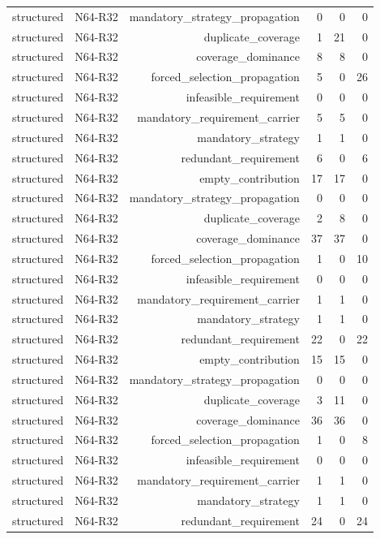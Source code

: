 {\begin{longtable}{lrrrrr}
structured & N64-R32 & mandatory\_strategy\_propagation & 0 & 0 & 0 \\
structured & N64-R32 & duplicate\_coverage & 1 & 21 & 0 \\
structured & N64-R32 & coverage\_dominance & 8 & 8 & 0 \\
structured & N64-R32 & forced\_selection\_propagation & 5 & 0 & 26 \\
structured & N64-R32 & infeasible\_requirement & 0 & 0 & 0 \\
structured & N64-R32 & mandatory\_requirement\_carrier & 5 & 5 & 0 \\
structured & N64-R32 & mandatory\_strategy & 1 & 1 & 0 \\
structured & N64-R32 & redundant\_requirement & 6 & 0 & 6 \\
structured & N64-R32 & empty\_contribution & 17 & 17 & 0 \\
structured & N64-R32 & mandatory\_strategy\_propagation & 0 & 0 & 0 \\
structured & N64-R32 & duplicate\_coverage & 2 & 8 & 0 \\
structured & N64-R32 & coverage\_dominance & 37 & 37 & 0 \\
structured & N64-R32 & forced\_selection\_propagation & 1 & 0 & 10 \\
structured & N64-R32 & infeasible\_requirement & 0 & 0 & 0 \\
structured & N64-R32 & mandatory\_requirement\_carrier & 1 & 1 & 0 \\
structured & N64-R32 & mandatory\_strategy & 1 & 1 & 0 \\
structured & N64-R32 & redundant\_requirement & 22 & 0 & 22 \\
structured & N64-R32 & empty\_contribution & 15 & 15 & 0 \\
structured & N64-R32 & mandatory\_strategy\_propagation & 0 & 0 & 0 \\
structured & N64-R32 & duplicate\_coverage & 3 & 11 & 0 \\
structured & N64-R32 & coverage\_dominance & 36 & 36 & 0 \\
structured & N64-R32 & forced\_selection\_propagation & 1 & 0 & 8 \\
structured & N64-R32 & infeasible\_requirement & 0 & 0 & 0 \\
structured & N64-R32 & mandatory\_requirement\_carrier & 1 & 1 & 0 \\
structured & N64-R32 & mandatory\_strategy & 1 & 1 & 0 \\
structured & N64-R32 & redundant\_requirement & 24 & 0 & 24 \\

\end{longtable}}
